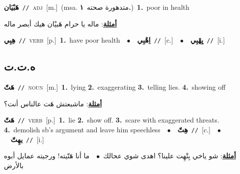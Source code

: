 \documentclass[10pt,a4paper,twoside]{article} %
\begin{document}
\begin{multicols}{2}
{\setlength\topsep{0pt}\textbf{\foreignlanguage{arabic}{هَبْيَان}}\ {\color{gray}\texttt{//}\color{black}}\ \textsc{adj}\ [m.]\ \color{gray}(msa. \foreignlanguage{arabic}{متدهورة صحته}~\foreignlanguage{arabic}{\textbf{١.}})\color{black}\ \textbf{1.}~poor in health\  \begin{flushright}\color{gray}\foreignlanguage{arabic}{\textbf{\underline{\foreignlanguage{arabic}{أمثلة}}}: ماله يا حرام هَبيْان هيك أبصر ماله}\end{flushright}\color{black}} \vspace{2mm}

{\setlength\topsep{0pt}\textbf{\foreignlanguage{arabic}{هِبِي}}\ {\color{gray}\texttt{//}\color{black}}\ \textsc{verb}\ [p.]\ \textbf{1.}~have poor health\ \ $\bullet$\ \ \setlength\topsep{0pt}\textbf{\foreignlanguage{arabic}{اِهْبِي}}\ {\color{gray}\texttt{//}\color{black}}\ [c.]\ \ $\bullet$\ \ \setlength\topsep{0pt}\textbf{\foreignlanguage{arabic}{يِهْبِي}}\ {\color{gray}\texttt{//}\color{black}}\ [i.]\ } \vspace{2mm}

\vspace{-3mm}
\subsection*{\color{blue}\foreignlanguage{arabic}{ه.ت.ت}\color{blue}{}} 

{\setlength\topsep{0pt}\textbf{\foreignlanguage{arabic}{هَتّ}}\ {\color{gray}\texttt{//}\color{black}}\ \textsc{noun}\ [m.]\ \textbf{1.}~lying  \textbf{2.}~exaggerating  \textbf{3.}~telling lies.  \textbf{4.}~showing off\  \begin{flushright}\color{gray}\foreignlanguage{arabic}{\textbf{\underline{\foreignlanguage{arabic}{أمثلة}}}: ماشبعتش هَت عالناس أنت؟}\end{flushright}\color{black}} \vspace{2mm}

{\setlength\topsep{0pt}\textbf{\foreignlanguage{arabic}{هَتّ}}\ {\color{gray}\texttt{//}\color{black}}\ \textsc{verb}\ [p.]\ \textbf{1.}~lie  \textbf{2.}~show off.  \textbf{3.}~scare with exaggerated threats.  \textbf{4.}~demolish sb's argument and leave him speechless\ \ $\bullet$\ \ \setlength\topsep{0pt}\textbf{\foreignlanguage{arabic}{هِتّ}}\ {\color{gray}\texttt{//}\color{black}}\ [c.]\ \ $\bullet$\ \ \setlength\topsep{0pt}\textbf{\foreignlanguage{arabic}{يهِتّ}}\ {\color{gray}\texttt{//}\color{black}}\ [i.]\  \begin{flushright}\color{gray}\foreignlanguage{arabic}{\textbf{\underline{\foreignlanguage{arabic}{أمثلة}}}: شو ياخي بِتْهِت علينا؟ اهدى شوي عحالك\ $\bullet$\ \  ما أنا هَتّيته! ورجيته عمايل أبوه بالأرض}\end{flushright}\color{black}} \vspace{2mm}


\end{multicols}
\end{document}
